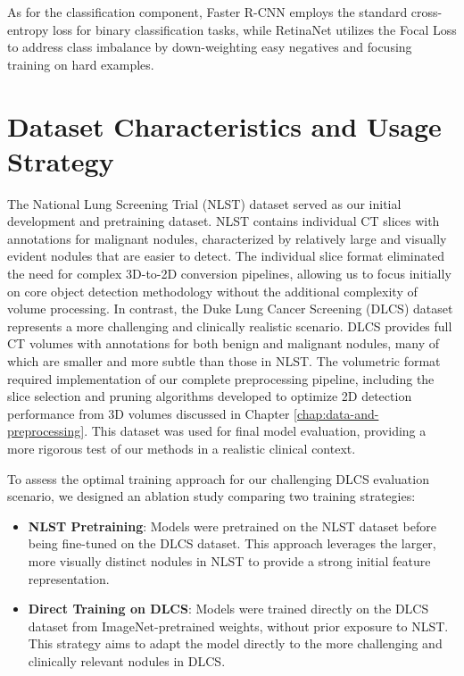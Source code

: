 As for the classification component, Faster R-CNN employs the standard cross-entropy loss for binary classification tasks, while RetinaNet utilizes the Focal Loss \cite{lin2018focalloss} to address class imbalance by down-weighting easy negatives and focusing training on hard examples.

\section{Dataset Characteristics and Usage Strategy}
The National Lung Screening Trial (NLST) dataset served as our initial development and pretraining dataset. NLST contains individual CT slices with annotations for malignant nodules, characterized by relatively large and visually evident nodules that are easier to detect. The individual slice format eliminated the need for complex 3D-to-2D conversion pipelines, allowing us to focus initially on core object detection methodology without the additional complexity of volume processing.
In contrast, the Duke Lung Cancer Screening (DLCS) dataset represents a more challenging and clinically realistic scenario. DLCS provides full CT volumes with annotations for both benign and malignant nodules, many of which are smaller and more subtle than those in NLST. The volumetric format required implementation of our complete preprocessing pipeline, including the slice selection and pruning algorithms developed to optimize 2D detection performance from 3D volumes discussed in Chapter \ref{chap:data-and-preprocessing}. This dataset was used for final model evaluation, providing a more rigorous test of our methods in a realistic clinical context.

To assess the optimal training approach for our challenging DLCS evaluation scenario, we designed an ablation study comparing two training strategies:
\begin{itemize}
    \item \textbf{NLST Pretraining}: Models were pretrained on the NLST dataset before being fine-tuned on the DLCS dataset. This approach leverages the larger, more visually distinct nodules in NLST to provide a strong initial feature representation.
    \item \textbf{Direct Training on DLCS}: Models were trained directly on the DLCS dataset from ImageNet-pretrained weights, without prior exposure to NLST. This strategy aims to adapt the model directly to the more challenging and clinically relevant nodules in DLCS.
\end{itemize}

